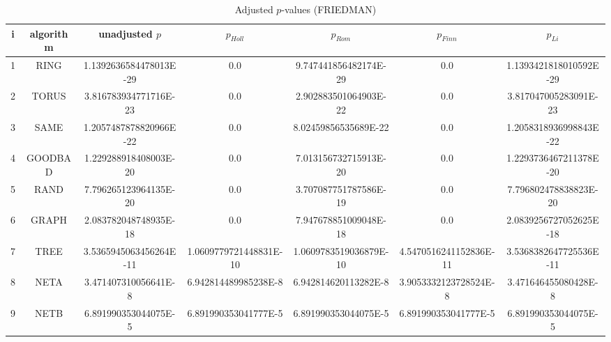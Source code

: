 \documentclass[a4paper,10pt]{article}
\begin{document}
\begin{landscape}
\begin{table}[!htp]
\centering\scriptsize
\caption{Adjusted $p$-values (FRIEDMAN)}
\begin{tabular}{ccccccc}
i&algorithm&unadjusted $p$&$p_{Holl}$&$p_{Rom}$&$p_{Finn}$&$p_{Li}$\\
\hline
1& RING&1.1392636584478013E-29&0.0&9.747441856482174E-29&0.0&1.1393421818010592E-29\\
2& TORUS&3.816783934771716E-23&0.0&2.902883501064903E-22&0.0&3.817047005283091E-23\\
3& SAME&1.2057487878820966E-22&0.0&8.02459856535689E-22&0.0&1.2058318936998843E-22\\
4& GOODBAD&1.229288918408003E-20&0.0&7.013156732715913E-20&0.0&1.2293736467211378E-20\\
5& RAND&7.796265123964135E-20&0.0&3.707087751787586E-19&0.0&7.796802478838823E-20\\
6& GRAPH&2.083782048748935E-18&0.0&7.947678851009048E-18&0.0&2.0839256727052625E-18\\
7& TREE&3.5365945063456264E-11&1.0609779721448831E-10&1.0609783519036879E-10&4.5470516241152836E-11&3.5368382647725536E-11\\
8& NETA&3.471407310056641E-8&6.942814489985238E-8&6.942814620113282E-8&3.9053332123728524E-8&3.471646455080428E-8\\
9& NETB&6.891990353044075E-5&6.891990353041777E-5&6.891990353044075E-5&6.891990353041777E-5&6.891990353044075E-5\\
\hline
\end{tabular}
\end{table}


\newpage


\end{landscape}
\end{document}
